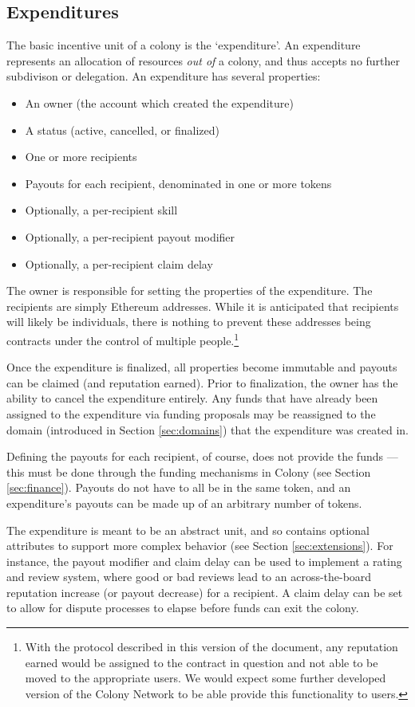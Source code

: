 \subsection{Expenditures}\label{sec:expenditures}

The basic incentive unit of a colony is the `expenditure'. An expenditure represents an allocation of resources \textit{out of} a colony, and thus accepts no further subdivison or delegation. An expenditure has several properties:

\begin{itemize}
\item An owner (the account which created the expenditure)
\item A status (active, cancelled, or finalized)
\item One or more recipients
\item Payouts for each recipient, denominated in one or more tokens
\item Optionally, a per-recipient skill
\item Optionally, a per-recipient payout modifier
\item Optionally, a per-recipient claim delay
\end{itemize}

The owner is responsible for setting the properties of the expenditure. The recipients are simply Ethereum addresses. While it is anticipated that recipients will likely be individuals, there is nothing to prevent these addresses being contracts under the control of multiple people.\footnote{With the protocol described in this version of the document, any reputation earned would be assigned to the contract in question and not able to be moved to the appropriate users. We would expect some further developed version of the Colony Network to be able provide this functionality to users.}

Once the expenditure is finalized, all properties become immutable and payouts can be claimed (and reputation earned). Prior to finalization, the owner has the ability to cancel the expenditure entirely. Any funds that have already been assigned to the expenditure via funding proposals may be reassigned to the domain (introduced in Section \ref{sec:domains}) that the expenditure was created in.

Defining the payouts for each recipient, of course, does not provide the funds --- this must be done through the funding mechanisms in Colony (see Section \ref{sec:finance}). Payouts do not have to all be in the same token, and an expenditure's payouts can be made up of an arbitrary number of tokens.

The expenditure is meant to be an abstract unit, and so contains optional attributes to support more complex behavior (see Section \ref{sec:extensions}). For instance, the payout modifier and claim delay can be used to implement a rating and review system, where good or bad reviews lead to an across-the-board reputation increase (or payout decrease) for a recipient. A claim delay can be set to allow for dispute processes to elapse before funds can exit the colony.